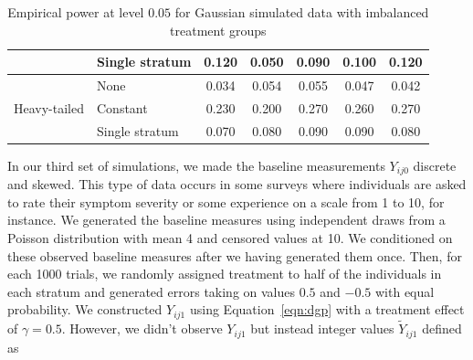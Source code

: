 \documentclass[12pt]{article}
\begin{document}
\begin{table}[ht]
\begin{tabular}{ll|ccccc}
                              & Single stratum                                              & 0.120                      & 0.050                                                                                & 0.090                                                                                 & 0.100                                                                        & 0.120                                                                        \\ \hline
\multirow{3}{*}{Heavy-tailed} & None                                                        & 0.034                      & 0.054                                                                                & 0.055                                                                                 & 0.047                                                                        & 0.042                                                                        \\
                              & Constant                                                    & 0.230                      & 0.200                                                                                & 0.270                                                                                 & 0.260                                                                        & 0.270                                                                        \\
                              & Single stratum                                              & 0.070                      & 0.080                                                                                & 0.090                                                                                 & 0.090                                                                        & 0.080                                                                        \\ \hline
\end{tabular}
\caption{Empirical power at level $0.05$ for Gaussian simulated data with imbalanced treatment groups} 
\end{table}

In our third set of simulations, we made the baseline measurements $Y_{ij0}$ discrete and skewed.
This type of data occurs in some surveys where individuals are asked to rate their symptom severity or some experience on a scale from 1 to 10, for instance.
We generated the baseline measures using independent draws from a Poisson distribution with mean 4 and censored values at 10.
We conditioned on these observed baseline measures after we having generated them once.
Then, for each 1000 trials, we randomly assigned treatment to half of the individuals in each stratum and generated errors taking on values $0.5$ and $-0.5$ with equal probability.
We constructed $Y_{ij1}$ using Equation~\ref{eqn:dgp} with a treatment effect of $\gamma = 0.5$.
However, we didn't observe $Y_{ij1}$ but instead integer values $\tilde{Y}_{ij1}$ defined as 
\end{document}
